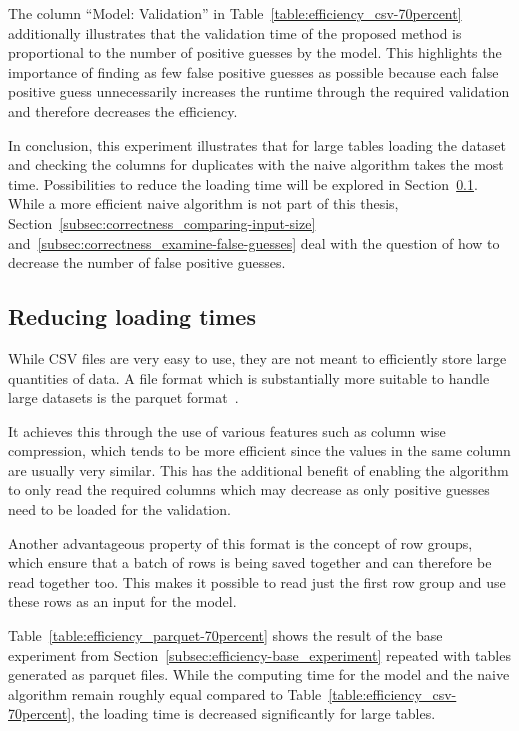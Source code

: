 The column \enquote{Model: Validation} in Table~\ref{table:efficiency_csv-70percent} additionally illustrates that the validation time of the proposed method is proportional to the number of positive guesses by the model. This highlights the importance of finding as few false positive guesses as possible because each false positive guess unnecessarily increases the runtime through the required validation and therefore decreases the efficiency.

In conclusion, this experiment illustrates that for large tables loading the dataset and checking the columns for duplicates with the naive algorithm takes the most time. Possibilities to reduce the loading time will be explored in Section~\ref{subsec:efficiency-shorter_loading_times}. While a more efficient naive algorithm is not part of this thesis, Section~\ref{subsec:correctness_comparing-input-size} and~\ref{subsec:correctness_examine-false-guesses} deal with the question of how to decrease the number of false positive guesses.






\subsection{Reducing loading times}\label{subsec:efficiency-shorter_loading_times}
While CSV files are very easy to use, they are not meant to efficiently store large quantities of data. A file format which is substantially more suitable to handle large datasets is the parquet format~\cite{parquet-book}.

It achieves this through the use of various features such as column wise compression, which tends to be more efficient since the values in the same column are usually very similar. This has the additional benefit of enabling the algorithm to only read the required columns which may decrease \io{} as only positive guesses need to be loaded for the validation.

Another advantageous property of this format is the concept of row groups, which ensure that a batch of rows is being saved together and can therefore be read together too. This makes it possible to read just the first row group and use these rows as an input for the model.

Table~\ref{table:efficiency_parquet-70percent} shows the result of the base experiment from Section~\ref{subsec:efficiency-base_experiment} repeated with tables generated as parquet files. While the computing time for the model and the naive algorithm remain roughly equal compared to Table~\ref{table:efficiency_csv-70percent}, the loading time is decreased significantly for large tables. %

